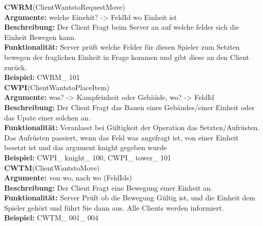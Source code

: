 \documentclass[a4paper, 12pt, oneside, headsepline=.5pt,footsepline=.5pt]{scrartcl}
\begin{document}
{\large \textbf{CWRM}(ClientWantstoRequestMove)} \\
\hspace{4ex} \textbf{Argumente:} {welche Einehit? -> FeldId wo Einheit ist} \\
\hspace{4ex} \textbf{Beschreibung:} {Der Client Fragt beim Server an auf welche felder sich die Einheit Bewegen kann.} \\
\hspace{4ex} \textbf{Funktionalität:} {Server prüft welche Felder für diesen Spieler zum Setzten bewegen der fraglichen Einheit in Frage kommen und gibt diese an den Client zurück.} \\
\hspace{4ex} \textbf{Beispiel:} {CWRM\_ 101} \\

{\large \textbf{CWPI}(ClientWantstoPlaceItem)} \\
\hspace{4ex} \textbf{Argumente:} {was? -> Kampfeinheit oder Gebäüde, wo? -> FeldId} \\
\hspace{4ex} \textbf{Beschreibung:} {Der Client Fragt das Bauen eines Gebäudes/einer Einheit oder das Upate einer solchen an.} \\
\hspace{4ex} \textbf{Funktionalität:} {Veranlasst bei Gültigkeit der Operation das Setzten/Aufrüsten. Das Aufrüsten passiert, wenn das Feld was angefragt ist, von einer Einheit besetzt ist und das argument knight gegeben wurde} \\
\hspace{4ex} \textbf{Beispiel:} {CWPI\_ knight\_ 100, CWPI\_ tower\_ 101} \\

{\large \textbf{CWTM}(ClientWantstoMove)} \\
\hspace{4ex} \textbf{Argumente:} {von wo, nach wo (FeldIds)} \\
\hspace{4ex} \textbf{Beschreibung:} {Der Client Fragt eine Bewegung einer Einheit an.} \\
\hspace{4ex} \textbf{Funktionalität:} {Server Prüft ob die Bewegung Gültig ist, und die Einheit dem Spieler gehört und führt Sie dann aus. Alle Clients werden informiert.} \\
\hspace{4ex} \textbf{Beispiel:} {CWTM\_ 001\_ 004} \\
\end{document}
